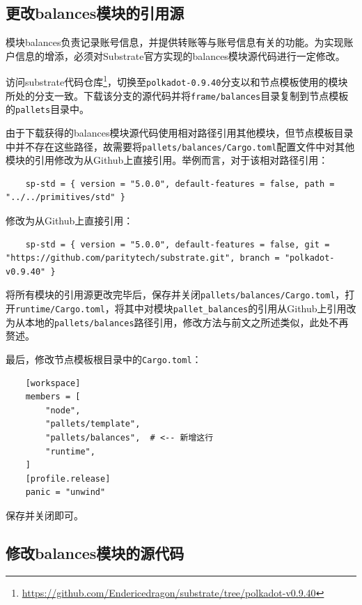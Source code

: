 \subsection{更改balances模块的引用源}

模块balances负责记录账号信息，并提供转账等与账号信息有关的功能。为实现账户信息的增添，必须对Substrate官方实现的balances模块源代码进行一定修改。

访问substrate代码仓库\footnote{\url{https://github.com/Endericedragon/substrate/tree/polkadot-v0.9.40}}，切换至\verb|polkadot-0.9.40|分支以和节点模板使用的模块所处的分支一致。下载该分支的源代码并将\verb|frame/balances|目录复制到节点模板的\verb|pallets|目录中。

由于下载获得的balances模块源代码使用相对路径引用其他模块，但节点模板目录中并不存在这些路径，故需要将\verb|pallets/balances/Cargo.toml|配置文件中对其他模块的引用修改为从Github上直接引用。举例而言，对于该相对路径引用：

\begin{lstlisting}
    sp-std = { version = "5.0.0", default-features = false, path = "../../primitives/std" }
\end{lstlisting}

修改为从Github上直接引用：

\begin{lstlisting}
    sp-std = { version = "5.0.0", default-features = false, git = "https://github.com/paritytech/substrate.git", branch = "polkadot-v0.9.40" }
\end{lstlisting}

将所有模块的引用源更改完毕后，保存并关闭\verb|pallets/balances/Cargo.toml|，打开\verb|runtime/Cargo.toml|，将其中对模块\verb|pallet_balances|的引用从Github上引用改为从本地的\verb|pallets/balances|路径引用，修改方法与前文之所述类似，此处不再赘述。

最后，修改节点模板根目录中的\verb|Cargo.toml|：

\begin{lstlisting}
    [workspace]
    members = [
        "node",
        "pallets/template",
        "pallets/balances",  # <-- 新增这行
        "runtime",
    ]
    [profile.release]
    panic = "unwind"
\end{lstlisting}

保存并关闭即可。

\subsection{修改balances模块的源代码}

